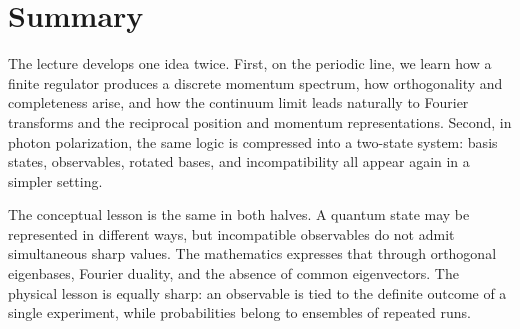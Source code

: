 \section{Summary}

The lecture develops one idea twice. First, on the periodic line, we learn how a finite regulator produces a discrete momentum spectrum, how orthogonality and completeness arise, and how the continuum limit leads naturally to Fourier transforms and the reciprocal position and momentum representations. Second, in photon polarization, the same logic is compressed into a two-state system: basis states, observables, rotated bases, and incompatibility all appear again in a simpler setting.

The conceptual lesson is the same in both halves. A quantum state may be represented in different ways, but incompatible observables do not admit simultaneous sharp values. The mathematics expresses that through orthogonal eigenbases, Fourier duality, and the absence of common eigenvectors. The physical lesson is equally sharp: an observable is tied to the definite outcome of a single experiment, while probabilities belong to ensembles of repeated runs.